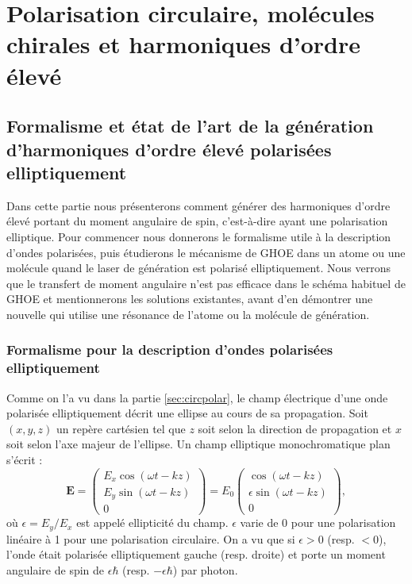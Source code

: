 \part{Polarisation circulaire, molécules chirales et harmoniques d'ordre élevé}
\label{PA:Spin_HHG}
\chapter{Formalisme et état de l'art de la génération d'harmoniques d'ordre élevé polarisées elliptiquement}
\label{CH:Circular_HHG}
Dans cette partie nous présenterons comment générer des harmoniques d'ordre élevé portant du moment angulaire de spin, c'est-à-dire ayant une polarisation elliptique. Pour commencer nous donnerons le formalisme utile à la description d'ondes polarisées, puis étudierons le mécanisme de GHOE dans un atome ou une molécule quand le laser de génération est polarisé elliptiquement. Nous verrons que le transfert de moment angulaire n'est pas efficace dans le schéma habituel de GHOE et mentionnerons les solutions existantes, avant d'en démontrer une nouvelle qui utilise une résonance de l'atome ou la molécule de génération.

\section{Formalisme pour la description d'ondes polarisées elliptiquement}
\label{sec:polardef}
Comme on l'a vu dans la partie \ref{sec:circpolar}, le champ électrique d'une onde polarisée elliptiquement décrit une ellipse au cours de sa propagation. Soit $(x,y,z)$ un repère cartésien tel que $z$ soit selon la direction de propagation et $x$ soit selon l'axe majeur de l'ellipse. Un champ elliptique monochromatique plan s'écrit :
\begin{equation}
\bm{E}=\begin{pmatrix}
E_{x}\cos{(\omega t-kz)}\\
E_{y}\sin{(\omega t-kz)}\\
0
\end{pmatrix}=E_{0}
\begin{pmatrix}
\cos{(\omega t-kz)}\\
\epsilon\sin{(\omega t-kz)}\\
0
\end{pmatrix},
\label{eq:jones}
\end{equation}
où $\epsilon = E_{y}/E_{x}$ est appelé ellipticité du champ. $\epsilon$ varie de 0 pour une polarisation linéaire à 1 pour une polarisation circulaire.  On a vu que si $\epsilon>0$ (resp. $<0$), l'onde était polarisée elliptiquement gauche (resp. droite) et porte un moment angulaire de spin de $\epsilon\hbar$ (resp. $-\epsilon\hbar$) par photon. 

